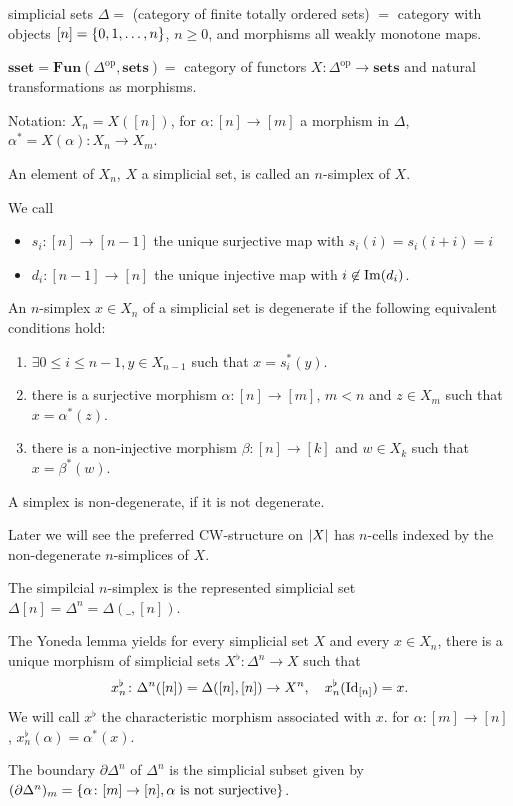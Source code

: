 \documentclass[language=english]{TemplateLecture}
\begin{document}
\begin{defi}{simplicial sets}{}
    \(\Delta = \) (category of finite totally ordered sets) \(=\) category with objects \([n] = \{0,1, \dots, n\}\), \(n\geq 0\), and morphisms all weakly monotone maps.

    \(\mathbf{sset} = \mathbf{Fun}(\Delta^{\text{op}}, \mathbf{sets}) =\) category of functors \(X\colon \Delta^{\text{op}}\to \mathbf{sets}\) and natural transformations as morphisms.

    Notation: \(X_n = X([n])\), for \(\alpha\colon [n] \to [m]\) a morphism in \(\Delta\), \(\alpha^* = X(\alpha)\colon X_n \to X_m\).

    An element of \(X_n\), \(X\) a simplicial set, is called an \(n\)-simplex of \(X\).

    We call
    \begin{itemize}
        \item \(s_i\colon [n] \to [n-1]\) the unique surjective map with \(s_i(i) = s_i(i+i) = i\)
        \item \(d_i\colon [n-1]\to [n]\) the unique injective map with \(i \not \in \operatorname{Im}(d_i)\).
    \end{itemize}

    An \(n\)-simplex \(x \in X_n\) of a simplicial set is degenerate if the following equivalent conditions hold:
    \begin{enumerate}
        \item \(\exists 0 \leq i \leq n-1, y \in X_{n-1}\) such that \(x = s_i^*(y)\).
        \item there is a surjective morphism \(\alpha\colon [n]\to [m]\), \(m < n\) and \(z \in X_m\) such that \(x = \alpha^*(z)\).
        \item there is a non-injective morphism \(\beta\colon [n] \to [k]\) and \(w\in X_k\) such that \(x = \beta^*(w)\).
    \end{enumerate}

    A simplex is non-degenerate, if it is not degenerate.

    Later we will see the preferred CW-structure on \(\lvert X\rvert\) has \(n\)-cells indexed by the non-degenerate \(n\)-simplices of \(X\).

    The simpilcial \(n\)-simplex is the represented simplicial set \(\Delta[n] = \Delta^n = \Delta(\_, [n])\).

    The Yoneda lemma yields for every simplicial set \(X\) and every \(x \in X_n\), there is a unique morphism of simplicial sets \(X^\flat \colon \Delta^n\to X\) such that
    \[x^\flat_n\colon \Delta^n([n]) = \Delta([n], [n])\to X^n, \quad x_n^\flat(\operatorname{Id}_{[n]}) = x.\]
    We will call \(x^\flat\) the characteristic morphism associated with \(x\). for \(\alpha\colon [m]\to [n]\), \(x_n^\flat(\alpha) = \alpha^*(x)\).

    The boundary \(\partial\Delta^n\) of \(\Delta^n\) is the simplicial subset given by \((\partial\Delta^n)_m = \{\alpha\colon [m]\to [n], \alpha \text{ is not surjective}\}\).
\end{defi}
\end{document}
